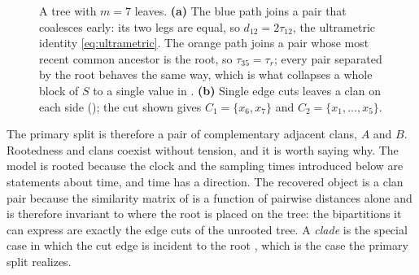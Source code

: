 \begin{figure}[t]
\begin{subfigure}[t]{0.49\textwidth}
\label{fig:topology-clans}
\end{subfigure}

\caption{A tree with $m=7$ leaves. \textbf{(a)} The blue path joins a pair that
coalesces early: its two legs are equal, so $d_{12}=2\tau_{12}$, the ultrametric
identity \eqref{eq:ultrametric}. The orange path joins a pair whose most recent
common ancestor is the root, so $\tau_{35}=\tau_r$; every pair separated by the root
behaves the same way, which is what collapses a whole block of $S$ to a single value
in . \textbf{(b)} Single edge cuts leaves a clan on each side
(); the cut shown gives $C_1=\{x_6,x_7\}$ and
$C_2=\{x_1,\dots,x_5\}$.}
\label{fig:tree_topology}
\end{figure}

The primary split is therefore a pair of complementary adjacent clans, $A$ and $B$.
Rootedness and clans coexist without tension, and it is worth saying why. The model
is rooted because the clock and the sampling times introduced below are statements
about time, and time has a direction. The recovered object is a clan pair because
the similarity matrix of  is a function of pairwise distances
alone and is therefore invariant to where the root is placed on the tree: the
bipartitions it can express are exactly the edge cuts of the unrooted tree. A
\emph{clade} is the special case in which the cut edge is incident to the root
\cite{wilkinson2007clades}, which is the case the primary split realizes.


